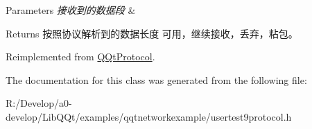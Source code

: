 \begin{DoxyParams}{Parameters}
{\em 接收到的数据段} & \\
\hline
\end{DoxyParams}
\begin{DoxyReturn}{Returns}
按照协议解析到的数据长度 可用，继续接收，丢弃，粘包。 
\end{DoxyReturn}


Reimplemented from \mbox{\hyperlink{class_q_qt_protocol_a00fd0c1ac23379ed3b9b25da9a34f39b}{Q\+Qt\+Protocol}}.



The documentation for this class was generated from the following file\+:\begin{DoxyCompactItemize}
\item 
R\+:/\+Develop/a0-\/develop/\+Lib\+Q\+Qt/examples/qqtnetworkexample/usertest9protocol.\+h\end{DoxyCompactItemize}

